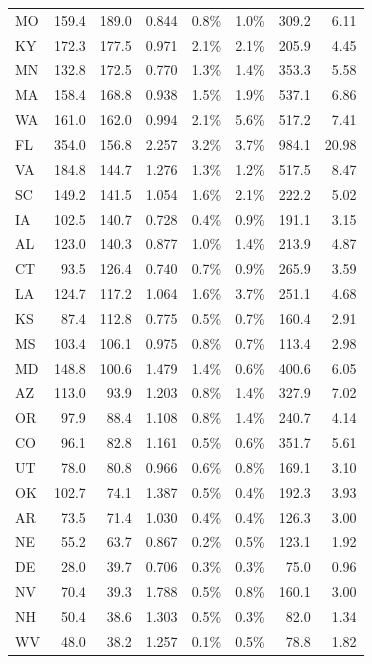\documentclass[12pt,oneside]{book}
\begin{document}
\begin{footnotesize}
\begin{singlespace}
\begin{longtable}{l r r r r r r r}
MO & 159.4 & 189.0 & 0.844 & 0.8\% & 1.0\% & 309.2 & 6.11 \\
KY & 172.3 & 177.5 & 0.971 & 2.1\% & 2.1\% & 205.9 & 4.45 \\
MN & 132.8 & 172.5 & 0.770 & 1.3\% & 1.4\% & 353.3 & 5.58 \\
MA & 158.4 & 168.8 & 0.938 & 1.5\% & 1.9\% & 537.1 & 6.86 \\
WA & 161.0 & 162.0 & 0.994 & 2.1\% & 5.6\% & 517.2 & 7.41 \\
FL & 354.0 & 156.8 & 2.257 & 3.2\% & 3.7\% & 984.1 & 20.98 \\
VA & 184.8 & 144.7 & 1.276 & 1.3\% & 1.2\% & 517.5 & 8.47 \\
SC & 149.2 & 141.5 & 1.054 & 1.6\% & 2.1\% & 222.2 & 5.02 \\
IA & 102.5 & 140.7 & 0.728 & 0.4\% & 0.9\% & 191.1 & 3.15 \\
AL & 123.0 & 140.3 & 0.877 & 1.0\% & 1.4\% & 213.9 & 4.87 \\
CT & 93.5 & 126.4 & 0.740 & 0.7\% & 0.9\% & 265.9 & 3.59 \\
LA & 124.7 & 117.2 & 1.064 & 1.6\% & 3.7\% & 251.1 & 4.68 \\
KS & 87.4 & 112.8 & 0.775 & 0.5\% & 0.7\% & 160.4 & 2.91 \\
MS & 103.4 & 106.1 & 0.975 & 0.8\% & 0.7\% & 113.4 & 2.98 \\
MD & 148.8 & 100.6 & 1.479 & 1.4\% & 0.6\% & 400.6 & 6.05 \\
AZ & 113.0 & 93.9 & 1.203 & 0.8\% & 1.4\% & 327.9 & 7.02 \\
OR & 97.9 & 88.4 & 1.108 & 0.8\% & 1.4\% & 240.7 & 4.14 \\
CO & 96.1 & 82.8 & 1.161 & 0.5\% & 0.6\% & 351.7 & 5.61 \\
UT & 78.0 & 80.8 & 0.966 & 0.6\% & 0.8\% & 169.1 & 3.10 \\
OK & 102.7 & 74.1 & 1.387 & 0.5\% & 0.4\% & 192.3 & 3.93 \\
AR & 73.5 & 71.4 & 1.030 & 0.4\% & 0.4\% & 126.3 & 3.00 \\
NE & 55.2 & 63.7 & 0.867 & 0.2\% & 0.5\% & 123.1 & 1.92 \\
DE & 28.0 & 39.7 & 0.706 & 0.3\% & 0.3\% & 75.0 & 0.96 \\
NV & 70.4 & 39.3 & 1.788 & 0.5\% & 0.8\% & 160.1 & 3.00 \\
NH & 50.4 & 38.6 & 1.303 & 0.5\% & 0.3\% & 82.0 & 1.34 \\
WV & 48.0 & 38.2 & 1.257 & 0.1\% & 0.5\% & 78.8 & 1.82 \\

\end{longtable}
\end{singlespace}
\end{footnotesize}
\end{document}
